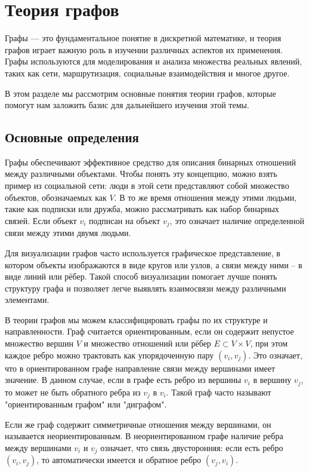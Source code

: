 \section{Теория графов}

Графы — это фундаментальное понятие в дискретной математике, и теория графов играет важную роль в изучении различных аспектов их применения. Графы используются для моделирования и анализа множества реальных явлений, таких как сети, маршрутизация, социальные взаимодействия и многое другое.

В этом разделе мы рассмотрим основные понятия теории графов, которые помогут нам заложить базис для дальнейшего изучения этой темы.

\subsection{Основные определения}

Графы обеспечивают эффективное средство для описания бинарных отношений между различными объектами. Чтобы понять эту концепцию, можно взять пример из социальной сети: люди в этой сети представляют собой множество объектов, обозначаемых как $V$. В то же время отношения между этими людьми, такие как подписки или дружба, можно рассматривать как набор бинарных связей. Если объект $v_i$ подписан на объект $v_j$, это означает наличие определенной связи между этими двумя людьми.

Для визуализации графов часто используется графическое представление, в котором объекты изображаются в виде кругов или узлов, а связи между ними – в виде линий или рёбер. Такой способ визуализации помогает лучше понять структуру графа и позволяет легче выявлять взаимосвязи между различными элементами.

В теории графов мы можем классифицировать графы по их структуре и направленности. Граф считается ориентированным, если он содержит непустое множество вершин $V$ и множество отношений или рёбер $E \subset V \times V$, при этом каждое ребро можно трактовать как упорядоченную пару $(v_i, v_j)$. Это означает, что в ориентированном графе направление связи между вершинами имеет значение. В данном случае, если в графе есть ребро из вершины $v_i$ в вершину $v_j$, то может не быть обратного ребра из $v_j$ в $v_i$. Такой граф часто называют "ориентированным графом" или "диграфом".

Если же граф содержит симметричные отношения между вершинами, он называется неориентированным. В неориентированном графе наличие ребра между вершинами $v_i$ и $v_j$ означает, что связь двусторонняя: если есть ребро $(v_i, v_j)$, то автоматически имеется и обратное ребро $(v_j, v_i)$.

